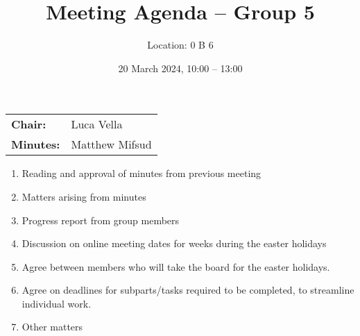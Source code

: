 \documentclass{cce2014-meetings}
\title{Meeting Agenda -- Group 5}
\author{Location: 0 B 6}
\date{20 March 2024, 10:00 -- 13:00}
\begin{document}
\maketitle
\begin{center}
    \begin{tabular}{ll}
        \textbf{Chair:}   & Luca Vella     \\
        \textbf{Minutes:} & Matthew Mifsud
    \end{tabular}
\end{center}

\begin{enumerate}
    \item Reading and approval of minutes from previous meeting

    \item Matters arising from minutes

    \item Progress report from group members

    \item Discussion on online meeting dates for weeks during the easter holidays

    \item Agree between members who will take the board for the easter holidays.

    \item Agree on deadlines for subparts/tasks required to be completed, to streamline individual work.

    \item Other matters
\end{enumerate}
\end{document}
